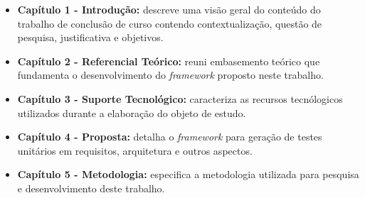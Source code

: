 	\begin{itemize}
		\item \textbf{Capítulo 1 - Introdução: } descreve uma visão geral do conteúdo do trabalho de conclusão de curso contendo contextualização, questão de pesquisa, justificativa e objetivos.
		\item \textbf{Capítulo 2 - Referencial Teórico: } reuni embasemento teórico que fundamenta o desenvolvimento do \textit{framework}  proposto neste trabalho.
		\item \textbf{Capítulo 3 - Suporte Tecnológico: } caracteriza as recursos tecnólogicos utilizados durante a elaboração do objeto de estudo.
		\item \textbf{Capítulo 4 - Proposta: } detalha o \textit{framework} para geração de testes unitários em requisitos, arquitetura e outros aspectos. 
		\item \textbf{Capítulo 5 - Metodologia: } especifica a metodologia utilizada para pesquisa e desenvolvimento deste trabalho.
	\end{itemize}